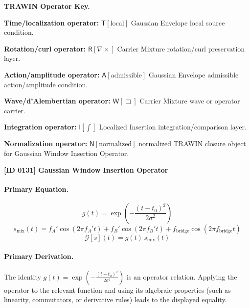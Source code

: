 \par\vspace{0.45\baselineskip}
\noindent\begin{minipage}[t]{\linewidth}
\begingroup
\small
\raggedright
\textbf{TRAWIN Operator Key.}\par
\noindent\textbf{Time/localization operator:} $\mathsf{T}\!\left[\mathrm{local}\right]$ Gaussian Envelope local source condition.\par
\noindent\textbf{Rotation/curl operator:} $\mathsf{R}\!\left[\nabla\times\right]$ Carrier Mixture rotation/curl preservation layer.\par
\noindent\textbf{Action/amplitude operator:} $\mathsf{A}\!\left[\mathrm{admissible}\right]$ Gaussian Envelope admissible action/amplitude condition.\par
\noindent\textbf{Wave/d'Alembertian operator:} $\mathsf{W}\!\left[\Box\right]$ Carrier Mixture wave or operator carrier.\par
\noindent\textbf{Integration operator:} $\mathsf{I}\!\left[\int\right]$ Localized Insertion integration/comparison layer.\par
\noindent\textbf{Normalization operator:} $\mathsf{N}\!\left[\mathrm{normalized}\right]$ normalized TRAWIN closure object for Gaussian Window Insertion Operator.\par
\endgroup
\end{minipage}

\clearpage
\noindent\textbf{[ID 0131] Gaussian Window Insertion Operator}\par
\vspace{0.35em}
\paragraph{Primary Equation.}
\[
g(t)=\exp\!\left(-\frac{(t-t_0)^2}{2\sigma^2}\right)
\]
\[
s_{\mathrm{mix}}(t)=f_A'\cos(2\pi f_A' t)+f_B'\cos(2\pi f_B' t)+f_{\mathrm{bridge}}\cos(2\pi f_{\mathrm{bridge}} t)
\]
\[
\mathcal{G}[s](t)=g(t)\,s_{\mathrm{mix}}(t)
\]

\paragraph{Primary Derivation.}
The identity \( g(t)=\exp\!\left(-\frac{(t-t_0)^2}{2\sigma^2}\right) \) is an operator relation. Applying the operator to the relevant function and using its algebraic properties (such as linearity, commutators, or derivative rules) leads to the displayed equality.
